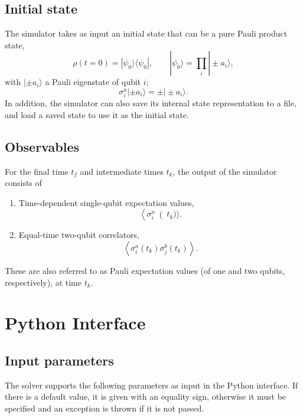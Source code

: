 \documentclass[aps,10pt,pra,twocolumn,groupedaddress,floatfix,superscriptaddress,showpacs,showkeys,amsfonts]{revtex4-2}
\newcommand{\be}{\begin{equation}}
\newcommand{\ee}{\end{equation}}
\begin{document}
\subsection{Initial state}\label{Sec:InitialState}

The simulator takes as input an initial state that can be a pure Pauli product state,
\be \rho(t=0) = |\psi_0\rangle\langle \psi_0|, \qquad |\psi_0\rangle = \prod_i |\pm a_i\rangle, \ee
with $|\pm a_i\rangle$ a Pauli eigenstate of qubit $i$;
\be \sigma_i^a|\pm a_i\rangle = \pm |\pm a_i\rangle.\ee
In addition, the simulator can also save its internal state representation to a file, and load a saved state to use it as the initial state.

\subsection{Observables}\label{Sec:Observables}


 For the final time $t_f$ and intermediate times $t_k$, the output of the simulator consists of
\begin{enumerate}
\item Time-dependent single-qubit expectation values, \be \left\langle \sigma_i^a\right (t_k)\rangle \label{Eq:mu}.\ee
\item Equal-time two-qubit correlators,
\be \left\langle \sigma_{i}^a(t_k) \sigma_{j}^b(t_k) \right\rangle . \label{Eq:etadef}\ee
\end{enumerate}
These are also referred to as Pauli expectation values (of one and two qubits, respectively), at time $t_k$.

%


\appendix

\section{Python Interface}\label{Sec:Interface}

\subsection{Input parameters}\label{Sec:Input}

The solver supports the following parameters as input in the Python interface. If there is a default value, it is given with an equality sign, otherwise it must be specified and an exception is thrown if it is not passed.
\\
\end{document}
